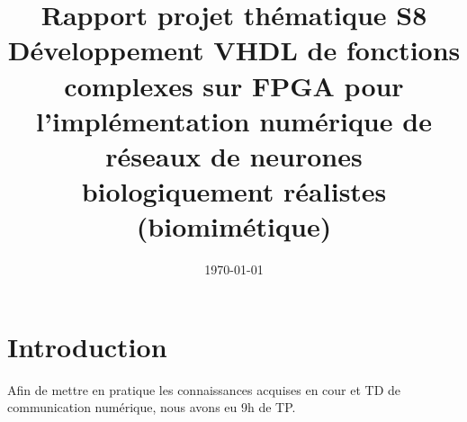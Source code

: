 \documentclass[hidelinks]{article}
\title{%
	Rapport projet thématique S8 \\
	\large{Développement VHDL de fonctions complexes sur FPGA pour l’implémentation numérique de réseaux de neurones biologiquement réalistes (biomimétique)}}
\date\today
\author{
	\bsc{DUMONDELLE Cédric}
	\and
	\bsc{LESTANDI Nathan}
}
\begin{document}
	\maketitle
	\newpage
	\tableofcontents
	\newpage
	\part*{Introduction}
	Afin de mettre en pratique les connaissances acquises en cour et TD de communication numérique, nous avons eu 9h de TP. \\
	\cite{ref1}
	\newpage
	
\end{document}

